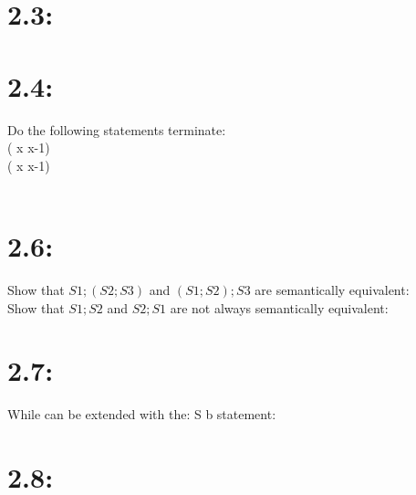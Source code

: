 \documentclass[a4paper]{paper}
\begin{document}
\section*{2.3:}

\section*{2.4:}
Do the following statements terminate:\\
 ( {\cass x x-1}) \\

 ( {\cass x x-1}) \\

  \cskip \\

\section{2.6:}
Show that $S1;(S2;S3)$ and $(S1;S2);S3$ are semantically equivalent: \\

Show that $S1;S2$ and $S2;S1$ are not always semantically equivalent:



\section{2.7:}
While can be extended with the:
 \crepeat S b statement:

\section{2.8:}
\end{document}
